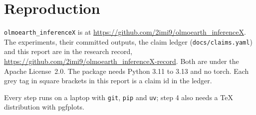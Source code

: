 \documentclass[11pt,a4paper]{article}
\newcommand{\pkg}{\texttt{olmoearth\_inferenceX}}
\newcommand{\code}[1]{\texttt{#1}}
\begin{document}
\section{Reproduction}
\label{sec:software}

\begin{sloppypar}
\pkg{} is at \url{https://github.com/2imi9/olmoearth_inferenceX}. The experiments, their committed outputs, the
claim ledger (\code{docs/claims.yaml}) and this report are in the research record,
\url{https://github.com/2imi9/olmoearth_inferenceX-record}. Both are under the Apache License~2.0. The package needs
Python 3.11 to 3.13 and no torch. Each grey tag in square brackets in this report is a claim id in the ledger.
\end{sloppypar}

Every step runs on a laptop with \code{git}, \code{pip} and \code{uv}; step 4 also needs a TeX
distribution with pgfplots.
\end{document}
